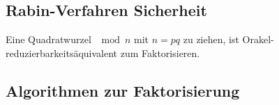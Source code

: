 \documentclass[a4paper, 12pt]{article}
\theoremstyle{plain}
\theoremstyle{definition}
\theoremstyle{lemma}
\theoremstyle{remark}
\theoremstyle{corollary}
\theoremstyle{example}
\begin{document}
	\subsection{Rabin-Verfahren Sicherheit}
	Eine Quadratwurzel $\mod n$ mit $n = pq$ zu ziehen, ist Orakel-reduzierbarkeitsäquivalent zum Faktorisieren.
	\subsection{Algorithmen zur Faktorisierung}
\end{document}
